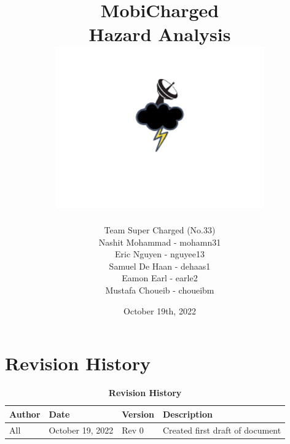 \documentclass[12pt, titlepage]{article}
\begin{document}
\title{
    MobiCharged\\Hazard Analysis
    \includegraphics[width=9cm]{images/mobicharged.png} 
}
\author{Team Super Charged (No.33)
		\\ Nashit Mohammad - mohamn31
		\\ Eric Nguyen - nguyee13
		\\ Samuel De Haan - dehaas1
		\\ Eamon Earl - earle2
		\\ Mustafa Choueib - choueibm
}
    

\date{October 19th, 2022}


\maketitle

\tableofcontents
\listoffigures
\listoftables

\vspace{20pt}


\newpage


\section{Revision History}
\begin{center}
\begin{table}[H]
\caption{\bf Revision History}
    \begin{tabular}{p{2cm}p{3cm}p{2cm}p{6cm}}
    \hline
    \bf Author & \bf Date & \bf Version & \bf Description\\
    \hline
    All & October 19, 2022 & Rev 0 & Created first draft of document\\
    \hline
    \end{tabular}
\end{table}
\end{center}
\end{document}
